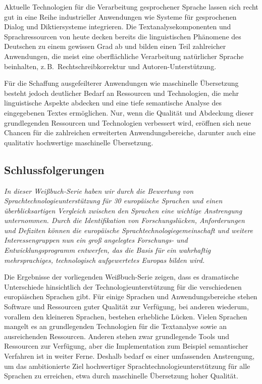 \documentclass[]{../../metanetpaper}
\begin{document}
\begin{multicols}{2}
Aktuelle Technologien für die Verarbeitung gesprochener Sprache lassen sich recht gut in eine Reihe industrieller Anwendungen wie Systeme für gesprochenen Dialog und Diktiersysteme integrieren. Die Textanalysekomponenten und Sprachressourcen von heute decken bereits die linguistischen Phänomene des Deutschen zu einem gewissen Grad ab und bilden einen Teil zahlreicher Anwendungen, die meist eine oberflächliche Verarbeitung natürlicher Sprache beinhalten, z.\,B.~Rechtschreibkorrektur und Autoren-Unterstützung.

Für die Schaffung ausgefeilterer Anwendungen wie maschinelle Übersetzung besteht jedoch deutlicher Bedarf an Ressourcen und Technologien, die mehr linguistische Aspekte abdecken und eine tiefe semantische Analyse des eingegebenen Textes ermöglichen. Nur, wenn die Qualität und Abdeckung dieser grundlegenden Ressourcen und Technologien verbessert wird, eröffnen sich neue Chancen für die zahlreichen erweiterten Anwendungsbereiche, darunter auch eine qualitativ hochwertige maschinelle Übersetzung.

\subsection{Schlussfolgerungen}

\emph{In dieser Weißbuch-Serie haben wir durch die Bewertung von Sprachtechnologieunterstützung für 30 europäische Sprachen und einen überblicksartigen Vergleich zwischen den Sprachen eine wichtige Anstrengung unternommen. Durch die Identifikation von Forschungslücken, Anforderungen und Defiziten können die europäische Sprachtechnologiegemeinschaft und weitere Interessengruppen nun ein groß angelegtes Forschungs- und Entwicklungsprogramm entwerfen, das die Basis für ein wahrhaftig mehrsprachiges, technologisch aufgewertetes Europas bilden wird.}

Die Ergebnisse der vorliegenden Weißbuch-Serie zeigen, dass es dramatische Unterschiede hinsichtlich der Technologieunterstützung für die verschiedenen europäischen Sprachen gibt. Für einige Sprachen und Anwendungsbereiche stehen Software und Ressourcen guter Qualität zur Verfügung, bei anderen wiederum, vorallem den kleineren Sprachen, bestehen erhebliche Lücken. Vielen Sprachen mangelt es an grundlegenden Technologien für die Textanalyse sowie an ausreichenden Ressourcen. Anderen stehen zwar grundlegende Tools und Ressourcen zur Verfügung, aber die Implementation zum Beispiel semantischer Verfahren ist in weiter Ferne. Deshalb bedarf es einer umfassenden Anstrengung, um das ambitionierte Ziel hochwertiger Sprachtechnologieunterstützung für alle Sprachen zu erreichen, etwa durch maschinelle Übersetzung hoher Qualität.


\end{multicols}
\end{document}
